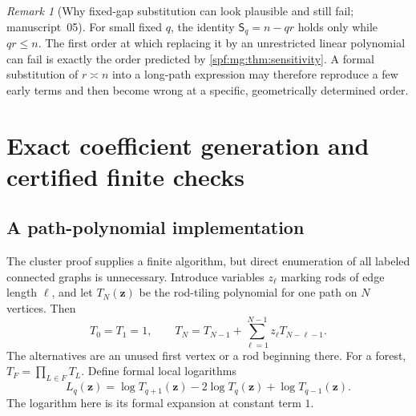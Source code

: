 \documentclass[11pt]{article}
\numberwithin{equation}{section}
\theoremstyle{definition}
\theoremstyle{remark}
\newtheorem{remark}[theorem]{Remark}
\theoremstyle{definition}
\begin{document}
\begin{remark}[Why fixed-gap substitution can look plausible and still fail; manuscript~05]
For small fixed $q$, the identity $\mathsf S_q=n-qr$ holds only while $qr\le n$.
The first order at which replacing it by an unrestricted linear
polynomial can fail is exactly the order predicted by
\cref{spf:mg:thm:sensitivity}. A formal substitution of $r\asymp n$ into a
long-path expression may therefore reproduce a few early terms and
then become wrong at a specific, geometrically determined order.
\end{remark}

\section{Exact coefficient generation and certified finite checks}
\label{spf:mg:sec:verification}

\subsection{A path-polynomial implementation}
\label{spf:mg:sec:algorithm}

The cluster proof supplies a finite algorithm, but direct enumeration of
all labeled connected graphs is unnecessary. Introduce variables
$z_\ell$ marking rods of edge length $\ell$, and let $T_N(\mathbf z)$ be
the rod-tiling polynomial for one path on $N$ vertices. Then
\begin{equation}
 T_0=T_1=1,\qquad
 T_N=T_{N-1}+\sum_{\ell=1}^{N-1}z_\ell T_{N-\ell-1}.
 \label{spf:mg:eq:T-rec}
\end{equation}
The alternatives are an unused first vertex or a rod beginning there.
For a forest, $T_F=\prod_{L\in F}T_L$. Define formal local logarithms
\begin{equation}
 L_q(\mathbf z)=\log T_{q+1}(\mathbf z)
             -2\log T_q(\mathbf z)+\log T_{q-1}(\mathbf z).
 \label{spf:mg:eq:Lq}
\end{equation}
The logarithm here is its formal expansion at constant term $1$.
\end{document}
